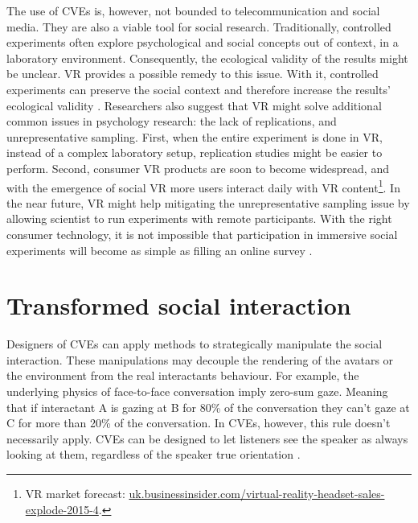 \documentclass[]{simple-thesis}
\begin{document}
The use of CVEs is, however, not bounded to telecommunication and social media.
They are also a viable tool for social research.
Traditionally, controlled experiments often explore psychological and social concepts out of context, in a laboratory environment.
Consequently, the ecological validity of the results might be unclear.
VR provides a possible remedy to this issue.
With it, controlled experiments can preserve the social context and therefore increase the results' ecological validity \citep{Loomis1999}.
Researchers also suggest that VR might solve additional common issues in psychology research: the lack of replications, and unrepresentative sampling.
First, when the entire experiment is done in VR, instead of a complex laboratory setup, replication studies might be easier to perform.
Second, consumer VR products are soon to become widespread, and with the emergence of social VR more users interact daily with VR content\footnote{VR market forecast: \href{http://uk.businessinsider.com/virtual-reality-headset-sales-explode-2015-4}{uk.businessinsider.com/virtual-reality-headset-sales-explode-2015-4}.}.
In the near future, VR might help mitigating the unrepresentative sampling issue by allowing scientist to run experiments with remote participants.
With the right consumer technology, it is not impossible that participation in immersive social experiments will become as simple as filling an online survey \citep{Blascovich2002}.

\section{Transformed social interaction}

Designers of CVEs can apply methods to strategically manipulate the social interaction.
These manipulations may decouple the rendering of the avatars or the environment from the real interactants behaviour.
For example, the underlying physics of face-to-face conversation imply zero-sum gaze.
Meaning that if interactant A is gazing at B for 80\% of the conversation they can't gaze at C for more than 20\% of the conversation.
In CVEs, however, this rule doesn't necessarily apply.
CVEs can be designed to let listeners see the speaker as always looking at them, regardless of the speaker true orientation \citep{Beall2003}.
\end{document}
